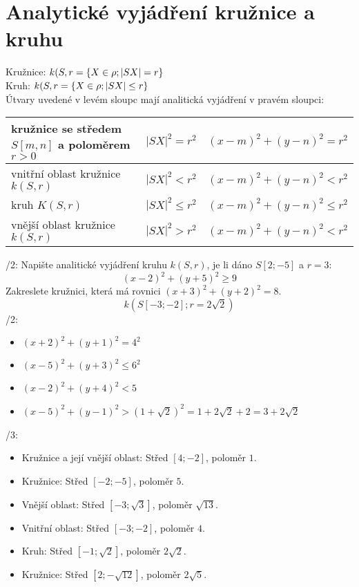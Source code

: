 
\BeginDoc{}
\section{Analytické vyjádření kružnice a kruhu}
\Def
Kružnice: $k(S,r = \left\{{X\in\rho;|SX|=r}\right\}$\\
Kruh: $k(S,r = \left\{{X\in\rho;|SX|\le r}\right\}$\\
\V Útvary uvedené v levém sloupc mají analitická vyjádření v pravém sloupci:\\
\begin{tabular}{|l|c|c|}\hline

	kružnice se středem $S[m,n]$ a poloměrem $r>0$ & $|SX|^2 = r^2$ & $(x-m)^2 + (y-n)^2 = r^2$ \\\hline
	vnitřní oblast kružnice $k(S,r)$& $|SX|^2 < r^2$ & $(x-m)^2 + (y-n)^2 < r^2$ \\\hline
	kruh $K(S,r)$& $|SX|^2 \le r^2$ & $(x-m)^2 + (y-n)^2 \le r^2$ \\\hline
	vnější oblast kružnice $k(S,r)$& $|SX|^2 > r^2$ & $(x-m)^2 + (y-n)^2 < r^2$ \\\hline
\end{tabular}
/2:
Napište analitické vyjádření kruhu $k(S,r)$, je li dáno $S[2;-5]$ a $r=3$:
$$ (x-2)^2+(y+5)^2 \ge 9$$
Zakreslete kružnici, která má rovnici $(x+3)^2+(y+2)^2 = 8$.
$$ k(S[-3;-2];r=2\sqrt 2) $$
/2:
\begin{itemize}
	\item $(x+2)^2+(y+1)^2 = 4^2$
	\item $(x-5)^2+(y+3)^2 \le 6^2$
	\item $(x-2)^2+(y+4)^2 < 5$
	\item $(x-5)^2+(y-1)^2 > (1+\sqrt 2)^2 = 1+2\sqrt 2 +2 = 3 + 2 \sqrt 2$
\end{itemize}
/3:
\begin{itemize}
	\item Kružnice a její vnější oblast: Střed $[4;-2]$, poloměr $1$.
	\item Kružnice: Střed $[-2;-5]$, poloměr $5$.
	\item Vnější oblast: Střed $[-3;\sqrt 3]$, poloměr $\sqrt{13}$.
	\item Vnitřní oblast: Střed $[-3;-2]$, poloměr $4$.
	\item Kruh: Střed $[-1;\sqrt 2]$, poloměr $2\sqrt 2$.
	\item Kružnice: Střed $[2;-\sqrt{12}]$, poloměr $2 \sqrt 5$.
\end{itemize}
\EndDoc
